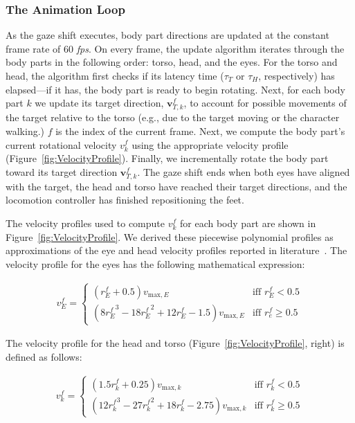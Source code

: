 \subsubsection{The Animation Loop}

As the gaze shift executes, body part directions are updated at the constant frame rate of 60 \emph{fps}. On every frame, the update algorithm iterates through the body parts in the following order: torso, head, and the eyes. For the torso and head, the algorithm first checks if its latency time ($\tau_T$ or $\tau_H$, respectively) has elapsed---if it has, the body part is ready to begin rotating. Next, for each body part $k$ we update its target direction, $\mathbf{v}^f_{T,k}$, to account for possible movements of the target relative to the torso (e.g., due to the target moving or the character walking.) $f$ is the index of the current frame. Next, we compute the body part's current rotational velocity $v^f_k$ using the appropriate velocity profile (Figure~\ref{fig:VelocityProfile}). Finally, we incrementally rotate the body part toward its target direction $\mathbf{v}^f_{T,k}$. The gaze shift ends when both eyes have aligned with the target, the head and torso have reached their target directions, and the locomotion controller has finished repositioning the feet.

The velocity profiles used to compute $v^f_k$ for each body part are shown in Figure~\ref{fig:VelocityProfile}. We derived these piecewise polynomial profiles as approximations of the eye and head velocity profiles reported in literature~\citep{kim2007head,lee2002eyes}. The velocity profile for the eyes has the following mathematical expression:

\begin{align} \label{eq:EyeVelocity}
v^f_E = \begin{cases}
(r^f_E + 0.5)v_{\mathrm{max},E} & \mbox{iff } r^f_E < 0.5 \\
(8{r^f_E}^3 - 18{r^f_E}^2 + 12r^f_E - 1.5)v_{\mathrm{max},E} & \mbox{iff } r^f_e \geq 0.5
\end{cases}
\end{align}

The velocity profile for the head and torso (Figure~\ref{fig:VelocityProfile}, right) is defined as follows:

\begin{align} \label{eq:HeadTorsoVelocity}
v^f_k = \begin{cases}
(1.5r^f_k + 0.25)v_{\mathrm{max},k} & \mbox{iff } r^f_k < 0.5 \\
(12{r^f_k}^3 - 27{r^f_k}^2 + 18r^f_k - 2.75)v_{\mathrm{max},k} & \mbox{iff } r^f_k \geq 0.5
\end{cases}
\end{align}

